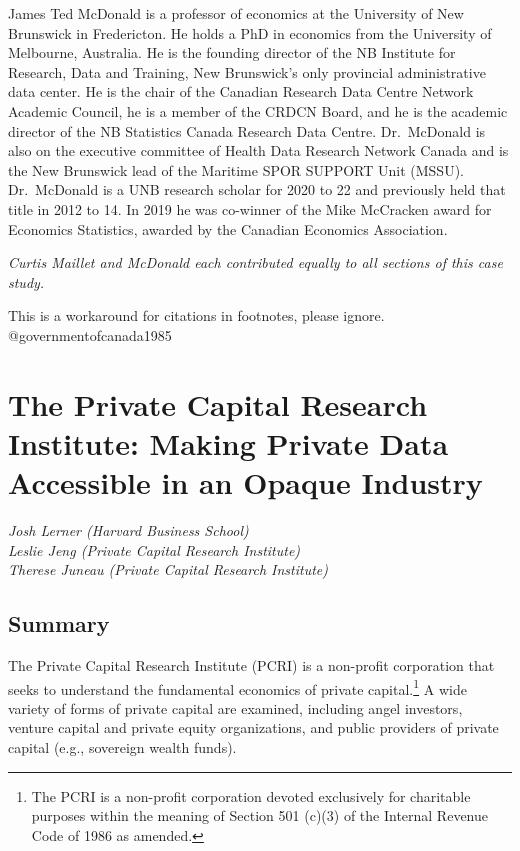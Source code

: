 \documentclass[
]{WileySix}
\begin{document}
James Ted McDonald is a professor of economics at the University of New Brunswick in Fredericton. He holds a PhD in economics from the University of Melbourne, Australia. He is the founding director of the NB Institute for Research, Data and Training, New Brunswick's only provincial administrative data center. He is the chair of the Canadian Research Data Centre Network Academic Council, he is a member of the CRDCN Board, and he is the academic director of the NB Statistics Canada Research Data Centre. Dr.~McDonald is also on the executive committee of Health Data Research Network Canada and is the New Brunswick lead of the Maritime SPOR SUPPORT Unit (MSSU). Dr.~McDonald is a UNB research scholar for 2020 to 22 and previously held that title in 2012 to 14. In 2019 he was co-winner of the Mike McCracken award for Economics Statistics, awarded by the Canadian Economics Association.

\emph{Curtis Maillet and McDonald each contributed equally to all sections of this case study.}

\begin{invisible}
This is a workaround for citations in footnotes, please ignore.
@governmentofcanada1985
\end{invisible}

\hypertarget{pcri}{%
\section{The Private Capital Research Institute: Making Private Data Accessible in an Opaque Industry}\label{pcri}}

\emph{Josh Lerner (Harvard Business School)}\\
\emph{Leslie Jeng (Private Capital Research Institute)}\\
\emph{Therese Juneau (Private Capital Research Institute)}

\hypertarget{summary-4}{%
\subsection{Summary}\label{summary-4}}

The Private Capital Research Institute (PCRI) is a non-profit corporation that seeks to understand the fundamental economics of private capital.\footnote{The PCRI is a non-profit corporation devoted exclusively for charitable purposes within the meaning of Section 501 (c)(3) of the Internal Revenue Code of 1986 as amended.} A wide variety of forms of private capital are examined, including angel investors, venture capital and private equity organizations, and public providers of private capital (e.g., sovereign wealth funds).
\end{document}
